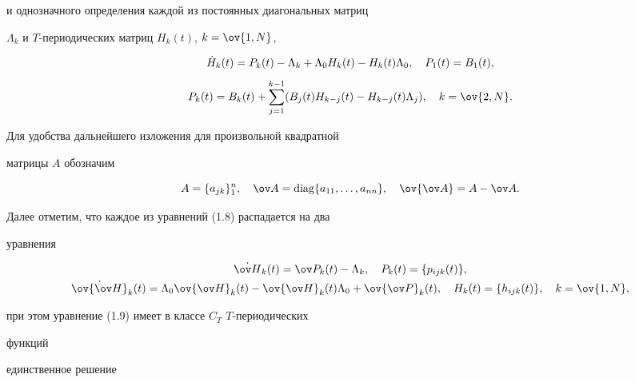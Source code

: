 \begin{pf}
и однозначного определения каждой из постоянных диагональных матриц  


$\Lambda_k$ и $T$-периодических матриц $H_k(t)$, $k=\ov{1,N}$, 


\begin{equation} 


\begin{array}{c} 


\Dot H_k(t)=P_k(t)-\Lambda_k+\Lambda_0H_k(t)- 


H_k(t)\Lambda_0,\quad P_1(t)=B_1(t),\\[3mm] 


P_k(t)=B_k(t)+\displaystyle\sum^{k-1}_{j=1} 


(B_j(t)H_{k-j}(t)-H_{k-j}(t)\Lambda_j),\quad k=\ov{2,N}. 


\end{array} 


\end{equation} 


 


Для удобства дальнейшего изложения для произвольной квадратной  


матрицы $A$ обозначим 


$$ 


A=\{a_{j k}\}^n_1,\quad \ov A=\diag\{a_{11},\dotsc,a_{n n}\}, 


\quad \ov{\ov A}=A-\ov A. 


$$ 


 


Далее отметим, что каждое из уравнений (1.8) распадается на два  


уравнения 


\begin{gather} 


\Dot{\ov H}_k(t)=\ov P_k(t)-\Lambda_k,\quad 


P_k(t)=\{p_{i j k}(t)\},\\ 


\Dot{\ov{\ov H}}_k(t)=\Lambda_0\ov{\ov H}_k(t)- 


\ov{\ov H}_k(t)\Lambda_0+\ov{\ov P}_k(t),\quad 


H_k(t)=\{h_{i j k}(t)\},\quad k=\ov{1,N}, 


\end{gather} 


при этом уравнение (1.9) имеет в классе $C_T$\; $T$-периодических 


функций 


единственное решение 



\end{pf}
